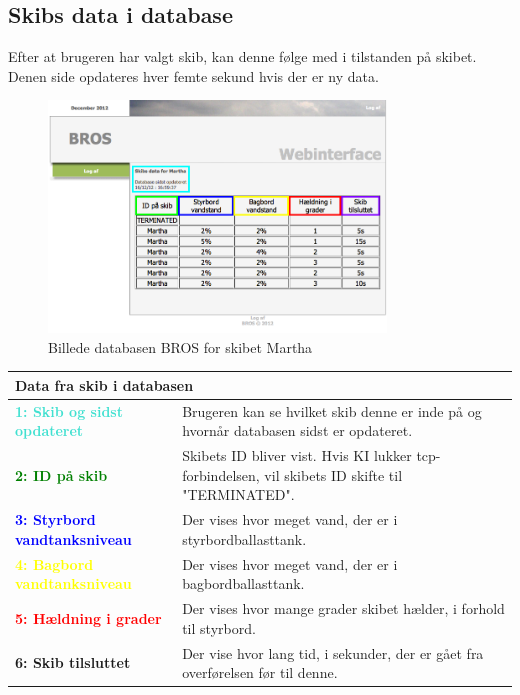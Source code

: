 \subsection*{Skibs data i database}
Efter at brugeren har valgt skib, kan denne følge med i tilstanden på skibet. Denen side opdateres hver femte sekund hvis der er ny data.
\begin{figure}[H]
	\centering
	\includegraphics[width=0.8\textwidth]{billeder/database/web_database}
	\caption{Billede databasen BROS for skibet Martha}
	\label{fig:web_database}
\end{figure}
\begin{table}[H]
\begin{tabular}{l p{12.5cm}}

\multicolumn{2}{l}{Data fra skib i databasen } \\
\hline
\textcolor{Turquoise}{\textbf{1: Skib og sidst opdateret}}
&Brugeren kan se hvilket skib denne er inde på og hvornår databasen sidst er opdateret.\\
\textcolor{green}{\textbf{2: ID på skib}}
&Skibets ID bliver vist. Hvis KI lukker tcp-forbindelsen, vil skibets ID skifte til "TERMINATED".\\
\textcolor{blue}{\textbf{3: Styrbord vandtanksniveau}}
&Der vises hvor meget vand, der er i styrbordballasttank.\\
\textcolor{yellow}{\textbf{4: Bagbord vandtanksniveau}}
&Der vises hvor meget vand, der er i bagbordballasttank.\\
\textcolor{red}{\textbf{5: Hældning i grader}}
&Der vises hvor mange grader skibet hælder, i forhold til styrbord.\\
\textcolor{RoyalPurple}{\textbf{6: Skib tilsluttet}}
&Der vise hvor lang tid, i sekunder, der er gået fra overførelsen før til denne.\\
\end{tabular}
\end{table}

